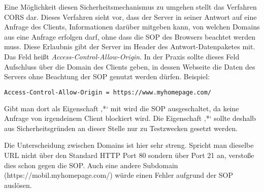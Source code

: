 Eine Möglichkeit diesen Sicherheitsmechanismus zu umgehen stellt das Verfahren \ac{CORS} dar. Dieses Verfahren sieht vor, dass der Server in seiner Antwort auf eine Anfrage des Clients, Informationen darüber mitgeben kann, von welchen Domains aus eine Anfrage erfolgen darf, ohne dass die \ac{SOP} des Browsers beachtet werden muss. Diese Erlaubnis gibt der Server im Header des Antwort-Datenpaketes mit. Das Feld heißt \emph{Access-Control-Allow-Origin}. In der Praxis sollte dieses Feld Aufschluss über die Domain des Clients geben, in dessen Webseite die Daten des Servers ohne Beachtung der \ac{SOP} genutzt werden dürfen.
Beispiel:

\begin{lstlisting}[language=HTML] 
Access-Control-Allow-Origin = https://www.myhomepage.com/
\end{lstlisting}

Gibt man dort als Eigenschaft ‚*‘ mit wird die \ac{SOP} ausgeschaltet, da keine Anfrage von irgendeinem Client blockiert wird. Die Eigenschaft ‚*‘ sollte deshalb aus Sicherheitsgründen an dieser Stelle nur zu Testzwecken gesetzt werden.\cite{AnnevanKesteren.2014} 

Die Unterscheidung zwischen Domains ist hier sehr streng. Spricht man dieselbe \ac{URL} nicht über den Standard \ac{HTTP} Port 80 \cite{ISOC.1999} sondern über Port 21 an, verstoße dies schon gegen die \ac{SOP}. Auch eine andere Subdomain (https://mobil.myhomepage.com/) würde einen Fehler aufgrund der \ac{SOP} auslösen. \cite[S.60]{Karlof.2007}
